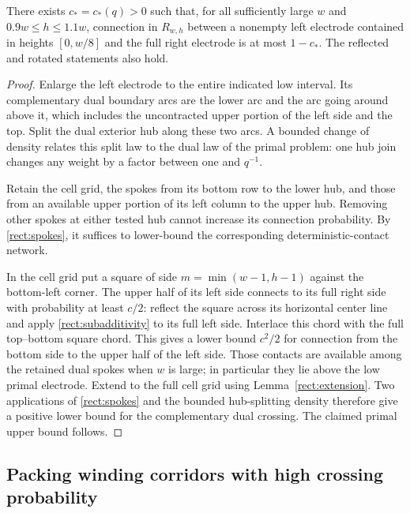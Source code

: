\begin{lemma}
\label{rect:corner}
There exists $c_*=c_*(q)>0$ such that, for all sufficiently large $w$
and $0.9w\le h\le1.1w$, connection in $R_{w,h}$ between a nonempty left
electrode contained in heights $[0,w/8]$ and the full right electrode is
at most $1-c_*$.  The reflected and rotated statements also hold.
\end{lemma}

\begin{proof}
Enlarge the left electrode to the entire indicated low interval.
Its complementary dual boundary arcs are the lower arc and the arc going
around above it, which includes the uncontracted upper portion of the
left side and the top.  Split the dual exterior hub along these two arcs.
A bounded change of density relates this split law to the dual law of
the primal problem: one hub join changes any weight by a factor between
one and $q^{-1}$.

Retain the cell grid, the spokes from its bottom row to the lower hub,
and those from an available upper portion of its left column to the
upper hub.  Removing other spokes at either tested hub cannot increase
its connection probability.  By \eqref{rect:spokes}, it suffices to
lower-bound the corresponding deterministic-contact network.

In the cell grid put a square of side
$m=\min(w-1,h-1)$ against the bottom-left corner.  The upper half of its
left side connects to its full right side with probability at least
$c/2$: reflect the square across its horizontal center line and apply
\eqref{rect:subadditivity} to its full left side.  Interlace this chord
with the full top--bottom square chord.  This gives a lower bound $c^2/2$
for connection from the bottom side to the upper half of the left side.
Those contacts are available among the retained dual spokes when $w$
is large; in particular they lie above the low primal electrode.
Extend to the full cell grid using Lemma~\ref{rect:extension}.  Two
applications of \eqref{rect:spokes} and the bounded hub-splitting density
therefore give a positive lower bound for the complementary dual
crossing.  The claimed primal upper bound follows.
\end{proof}

\subsection{Packing winding corridors with high crossing probability}

